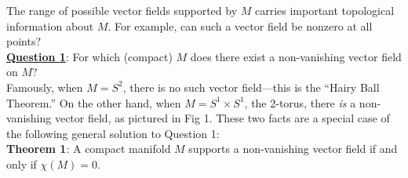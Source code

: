 \documentclass{amsart}
\begin{document}
	The range of possible vector fields supported by $M$ carries important topological information about $M$. For example, can such a vector field be nonzero at all points?\\
	
	\noindent \underline{\textbf{Question 1}}: For which (compact) $M$ does there exist a non-vanishing vector field on $M$?\\
	
	\noindent Famously, when $M=S^2$, there is no such vector field---this is the ``Hairy Ball Theorem.'' On the other hand, when $M=S^1\times S^1$, the 2-torus, there \textit{is} a non-vanishing vector field, as pictured in Fig 1. These two facts are a special case of the following general solution to Question 1:\\
	
	\noindent \textbf{Theorem 1}: A compact manifold $M$ supports a non-vanishing vector field if and only if $\chi(M)=0$.
	
\end{document}
